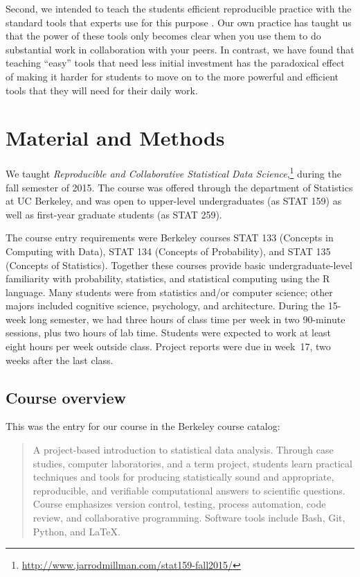 Second, we intended to teach the students efficient reproducible practice with
the standard tools that experts use for this purpose
\citep{millman2014developing}. Our own practice has taught us that the power
of these tools only becomes clear when you use them to do substantial work in
collaboration with your peers.  In contrast, we have found that teaching
``easy'' tools that need less initial investment has the paradoxical effect of
making it harder for students to move on to the more powerful and efficient
tools that they will need for their daily work.

\section{Material and Methods}\label{methods}

We taught \emph{Reproducible and Collaborative Statistical Data
Science},\footnote{\url{http://www.jarrodmillman.com/stat159-fall2015/}} during
the fall semester of 2015.  The course was offered through the department of
Statistics at UC Berkeley, and was open to upper-level undergraduates (as STAT
159) as well as first-year graduate students (as STAT 259).

The course entry requirements were Berkeley courses STAT 133 (Concepts in
Computing with Data), STAT 134 (Concepts of Probability), and STAT 135
(Concepts of Statistics).  Together these courses provide basic
undergraduate-level familiarity with probability, statistics, and statistical
computing using the R language.
Many students were from statistics and/or computer science; other majors
included cognitive science, psychology, and architecture.
During the 15-week long semester, we had three hours of class time per week in
two 90-minute sessions, plus two hours of lab time.  Students were expected to
work at least eight hours per week outside class.  Project reports were due in
week~17, two weeks after the last class.

\subsection{Course overview}

This was the entry for our course in the Berkeley course catalog:

\begin{quote}
A project-based introduction to statistical data analysis. Through case
studies, computer laboratories, and a term project, students learn
practical techniques and tools for producing statistically sound and
appropriate, reproducible, and verifiable computational answers to
scientific questions. Course emphasizes version control, testing,
process automation, code review, and collaborative programming.
Software tools include Bash, Git, Python, and \LaTeX.
\end{quote}

